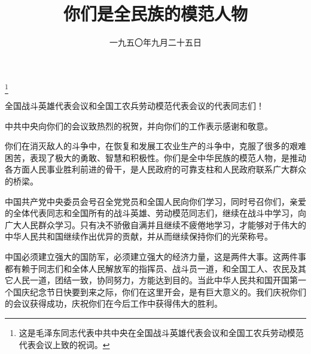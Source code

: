 
\title{你们是全民族的模范人物}
\date{一九五〇年九月二十五日}
\thanks{这是毛泽东同志代表中共中央在全国战斗英雄代表会议和全国工农兵劳动模范代表会议上致的祝词。}
\maketitle


全国战斗英雄代表会议和全国工农兵劳动模范代表会议的代表同志们！

中共中央向你们的会议致热烈的祝贺，并向你们的工作表示感谢和敬意。

你们在消灭敌人的斗争中，在恢复和发展工农业生产的斗争中，克服了很多的艰难困苦，表现了极大的勇敢、智慧和积极性。你们是全中华民族的模范人物，是推动各方面人民事业胜利前进的骨干，是人民政府的可靠支柱和人民政府联系广大群众的桥梁。

中国共产党中央委员会号召全党党员和全国人民向你们学习，同时号召你们，亲爱的全体代表同志和全国所有的战斗英雄、劳动模范同志们，继续在战斗中学习，向广大人民群众学习。只有决不骄傲自满并且继续不疲倦地学习，才能够对于伟大的中华人民共和国继续作出优异的贡献，并从而继续保持你们的光荣称号。

中国必须建立强大的国防军，必须建立强大的经济力量，这是两件大事。这两件事都有赖于同志们和全体人民解放军的指挥员、战斗员一道，和全国工人、农民及其它人民一道，团结一致，协同努力，方能达到目的。当此中华人民共和国开国第一个国庆纪念节日快要到来之际，你们在这里开会，是有巨大意义的。我们庆祝你们的会议获得成功，庆祝你们在今后工作中获得伟大的胜利。

